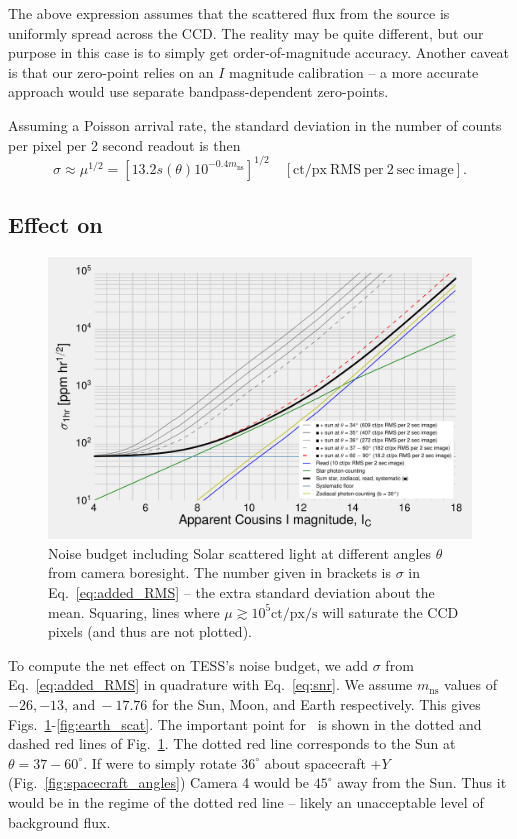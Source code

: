 The above expression assumes that the scattered flux from the source 
is uniformly spread across the CCD. The reality may be quite different,
but our purpose in this case is to simply get order-of-magnitude accuracy.
Another caveat is that our zero-point relies on an $I$ magnitude calibration -- 
a more accurate approach would use separate bandpass-dependent zero-points.

Assuming a Poisson arrival rate, the standard deviation in the number of counts 
per pixel per 2 second readout is then
\begin{equation}
\sigma \approx \mu^{1/2} = \left[ 13.2 s(\theta) 10^{-0.4 m_\mathrm{ns}} 
\right]^{1/2}\quad \mathrm{[ct/px\ RMS\ per\ 2\ sec\ image]}.
\label{eq:added_RMS}
\end{equation}

\subsection{Effect on  {\rm \npole}}
\label{sec:scattered_npole}
\begin{figure}[!t]
	\centering
	\includegraphics{figures/precision_angles_sun.pdf}
	\caption{Noise budget including Solar scattered light at different angles 
		$\theta$ from camera boresight. 
		The number given in brackets is $\sigma$ in 
		Eq.~\protect\ref{eq:added_RMS} --
		the extra standard deviation about the mean.
		Squaring, lines where $\mu \gtrsim 10^5 \mathrm{ct/px/s}$ will saturate 
		the CCD pixels (and thus are not plotted).} 
	\label{fig:sun_scat}
\end{figure}
To compute the net effect on TESS's noise budget, we add $\sigma$ from 
Eq.~\ref{eq:added_RMS} in quadrature with Eq.~\ref{eq:snr}.
We assume $m_\mathrm{ns}$ values of $-26,-13,\,\mathrm{and}\ -17.76$ for the 
Sun, Moon, and Earth respectively.
This gives Figs.~\ref{fig:sun_scat}-\ref{fig:earth_scat}.
The important point for \npole\ is shown in the dotted and dashed red lines of 
Fig.~\ref{fig:sun_scat}. 
The dotted red line corresponds to the Sun at $\theta=37-60^\circ$.
If \tess were to simply rotate $36^\circ$ about spacecraft $+Y$ 
(Fig.~\ref{fig:spacecraft_angles}) Camera 4 would be $45^\circ$
away from the Sun.
Thus it would be in the regime of the dotted red line -- likely an unacceptable 
level of background flux.

